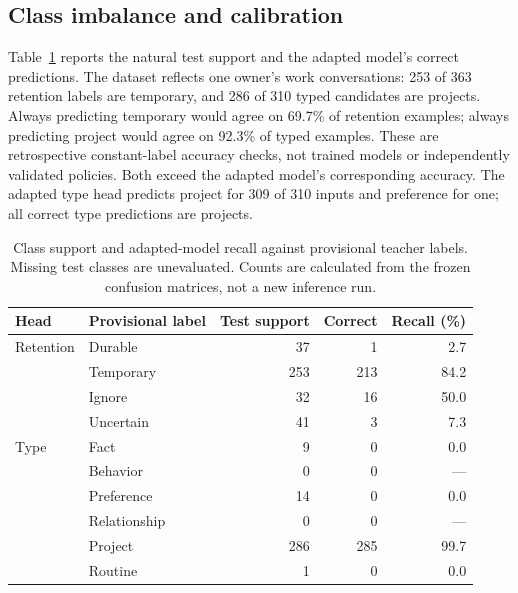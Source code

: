 \subsection{Class imbalance and calibration}
Table~\ref{tab:class-support} reports the natural test support and the adapted model's correct predictions. The dataset reflects one owner's work conversations: 253 of 363 retention labels are temporary, and 286 of 310 typed candidates are projects. Always predicting temporary would agree on 69.7\% of retention examples; always predicting project would agree on 92.3\% of typed examples. These are retrospective constant-label accuracy checks, not trained models or independently validated policies. Both exceed the adapted model's corresponding accuracy. The adapted type head predicts project for 309 of 310 inputs and preference for one; all correct type predictions are projects.

\begin{table}[htbp]
\centering\small
\begin{tabular}{@{}llrrr@{}}
\toprule
Head & Provisional label & Test support & Correct & Recall (\%)\\
\midrule
Retention & Durable & 37 & 1 & 2.7\\
 & Temporary & 253 & 213 & 84.2\\
 & Ignore & 32 & 16 & 50.0\\
 & Uncertain & 41 & 3 & 7.3\\
\midrule
Type & Fact & 9 & 0 & 0.0\\
 & Behavior & 0 & 0 & ---\\
 & Preference & 14 & 0 & 0.0\\
 & Relationship & 0 & 0 & ---\\
 & Project & 286 & 285 & 99.7\\
 & Routine & 1 & 0 & 0.0\\
\bottomrule
\end{tabular}
\caption{Class support and adapted-model recall against provisional teacher labels. Missing test classes are unevaluated. Counts are calculated from the frozen confusion matrices, not a new inference run.}
\label{tab:class-support}
\end{table}

